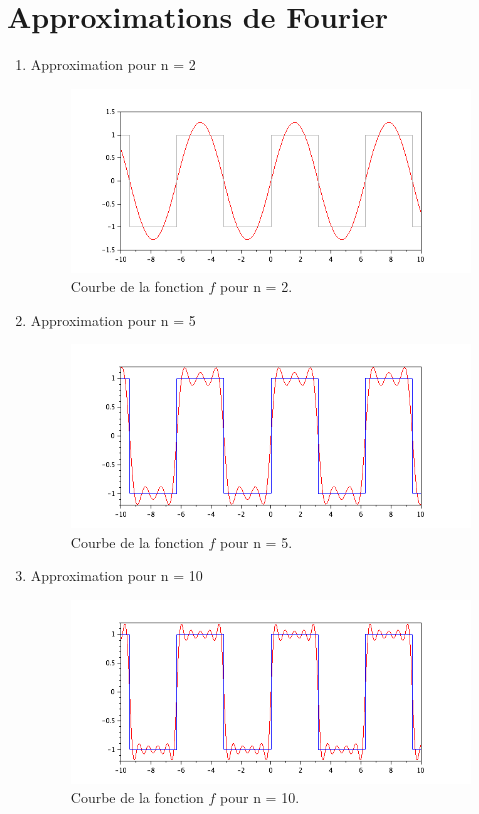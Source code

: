 \documentclass[a4paper,12pt]{report}
\begin{document}
\section{Approximations de Fourier}
\begin{enumerate}
	\item Approximation pour n = 2
		\begin{figure}[h!]
		\centering
		\includegraphics[scale=0.6]{ex3_figN2.png}
		\caption{\label{ex3figN2}Courbe de la fonction $f$ pour n = 2.}
		\end{figure}
		
	\item Approximation pour n = 5
		\begin{figure}[h!]
		\centering
		\includegraphics[scale=0.6]{ex3_figN5.png}
		\caption{\label{ex3figN5}Courbe de la fonction $f$ pour n = 5.}
		\end{figure}
		\newpage
	\item Approximation pour n = 10
		\begin{figure}[h!]
		\centering
		\includegraphics[scale=0.6]{ex3_figN10.png}
		\caption{\label{ex3figN10}Courbe de la fonction $f$ pour n = 10.}
		\end{figure}


\end{enumerate}
\end{document}
